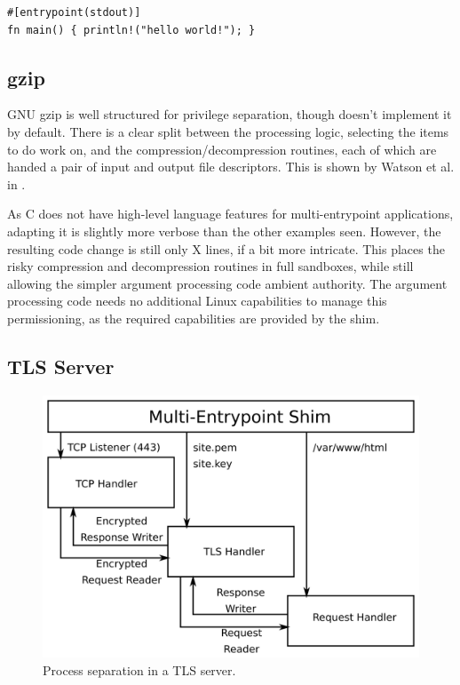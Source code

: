 \documentclass[sigplan]{acmart}
\begin{document}
\begin{lstlisting}[float,label={lst:deprivileged-application}]
#[entrypoint(stdout)]
fn main() { println!("hello world!"); }
\end{lstlisting}

\subsection{gzip}

GNU gzip \citep{gailly_gzip_2020} is well structured for privilege separation, though doesn't implement it by default. There is a clear split between the processing logic, selecting the items to do work on, and the compression/decompression routines, each of which are handed a pair of input and output file descriptors. This is shown by Watson et al. in \cite{watson_capsicum_2010}.

As C does not have high-level language features for multi-entrypoint applications, adapting it is slightly more verbose than the other examples seen. However, the resulting code change is still only X lines, if a bit more intricate. This places the risky compression and decompression routines in full sandboxes, while still allowing the simpler argument processing code ambient authority. The argument processing code needs no additional Linux capabilities to manage this permissioning, as the required capabilities are provided by the shim.

\subsection{TLS Server}

\begin{figure}
    \centering
    \includegraphics[width=\columnwidth]{figures/tls-server-splitting.png}
    \caption{Process separation in a TLS server.}
    \label{fig:tls-server-splitting}
\end{figure}
\end{document}

